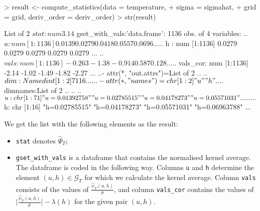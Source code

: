 \documentclass[a4paper]{scrartcl}
\begin{document}
\begin{enumerate}[label=\textit{Step \arabic*.}, leftmargin=1.45cm]
\begin{Schunk}
\begin{Sinput}
> result <- compute_statistics(data = temperature,
+                              sigma = sigmahat,
+                              grid = grid, deriv_order = deriv_order)
> str(result)
\end{Sinput}
\begin{Soutput}
List of 2
 $ stat          : num 3.14
 $ gset_with_vals:'data.frame':	1136 obs. of  4 variables:
  ..$ u       : num [1:1136] 0.0139 0.0279 0.0418 0.0557 0.0696 ...
  ..$ h       : num [1:1136] 0.0279 0.0279 0.0279 0.0279 0.0279 ...
  ..$ vals    : num [1:1136] -0.263 -1.38 -0.914 0.587 0.128 ...
  ..$ vals_cor: num [1:1136] -2.14 -1.02 -1.49 -1.82 -2.27 ...
  ..- attr(*, "out.attrs")=List of 2
  .. ..$ dim     : Named int [1:2] 71 16
  .. .. ..- attr(*, "names")= chr [1:2] "u" "h"
  .. ..$ dimnames:List of 2
  .. .. ..$ u: chr [1:71] "u=0.01392758" "u=0.02785515" "u=0.04178273" "u=0.05571031" ...
  .. .. ..$ h: chr [1:16] "h=0.02785515" "h=0.04178273" "h=0.05571031" "h=0.06963788" ...
\end{Soutput}
\end{Schunk}
We get the list with the following elements as the result:
\begin{itemize}
\item \verb|stat| denotes $\widehat{\Psi}_{T}$;
\item \verb|gset_with_vals| is a dataframe that contains the normalised kernel average. The dataframe is coded in the following way. Columns \verb|u| and \verb|h| determine the element $(u, h) \in \mathcal{G}_T$ for which we calculate the kernel average. Column \verb|vals| consists of the values of 
$\frac{\widehat{\psi}_{T}(u, h)}{\widehat{\sigma}}$, and column \verb|vals_cor| contains the values of $\Big|\frac{\widehat{\psi}_{T}(u, h)}{\widehat{\sigma}}\Big| - \lambda(h)$ for the given pair $(u, h)$.
\end{itemize}


\end{enumerate}
\end{document}
